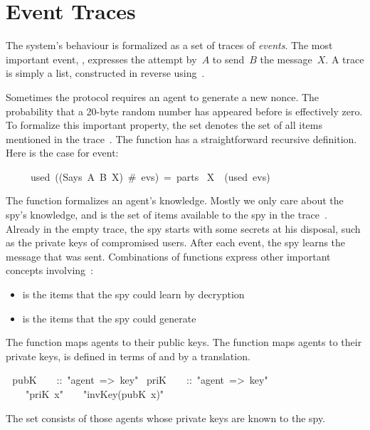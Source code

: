 \section{Event Traces}\label{sec:events}

The system's behaviour is formalized as a set of traces of
\emph{events}.  The most important event, , expresses the
attempt by~$A$ to send~$B$ the
  message~$X$.  A trace is simply a list, constructed in reverse
using~\isa{\#}.  

Sometimes the protocol requires an agent to generate a new nonce. The
probability that a 20-byte random number has appeared before is effectively
zero.  To formalize this important property, the set 
denotes the set of all items mentioned in the trace~.
The function  has a straightforward
recursive definition.  Here is the case for  event:
\begin{isabelle}
\ \ \ \ \ used\ ((Says\ A\ B\ X)\ \#\ evs)\ =\ parts\ \isacharbraceleft
X\isacharbraceright \ \isasymunion\ (used\ evs)
\end{isabelle}

The function  formalizes an agent's knowledge.  Mostly we only
care about the spy's knowledge, and  is the set of items
available to the spy in the trace~.  Already in the empty trace,
the spy starts with some secrets at his disposal, such as the private keys
of compromised users.  After each  event, the spy learns the
message that was sent.  Combinations of functions express other important
concepts involving~:
\begin{itemize}
\item {} is the items that the spy could
learn by decryption
\item {} is the items that the spy
could generate
\end{itemize}

The function
 maps agents to their public keys.  The function
 maps agents to their private keys, is defined in terms of
 and  by a translation.
\begin{isabelle}
\ \,pubK\ \ \ \ ::\ "agent\ =>\ key"\isanewline
{}\ priK\ \ \ \ ::\ "agent\ =>\ key"\isanewline
{}\ \ \ \ "priK\ x"\ \ \isasymrightleftharpoons\ \ "invKey(pubK\ x)"
\end{isabelle}
The set  consists of those agents whose private keys are known to
the spy.

